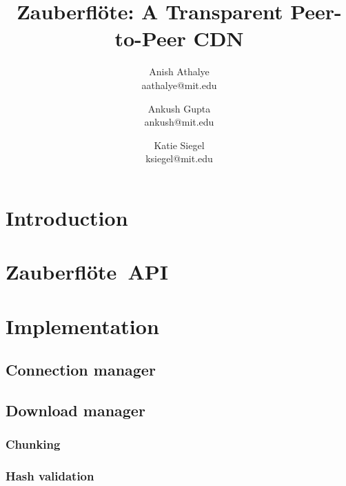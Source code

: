 \documentclass[letterpaper,twocolumn,10pt]{article}
\newcommand{\zbf}{Zauberfl\"{o}te}
\newcommand{\projtitle}{\zbf: A Transparent Peer-to-Peer CDN}
\begin{document}
\title{\Large \bf \projtitle}

\author{
    {\rm Anish Athalye}\\
    aathalye@mit.edu
    \and
    {\rm Ankush Gupta}\\
    ankush@mit.edu
    \and
    {\rm Katie Siegel}\\
    ksiegel@mit.edu
}

\maketitle
\thispagestyle{empty}

\begin{abstract}

\end{abstract}

\section{Introduction}


\section{\zbf\ API}


\section{Implementation}


\subsection{Connection manager}


\subsection{Download manager}


\subsubsection{Chunking}


\subsubsection{Hash validation}
\end{document}
